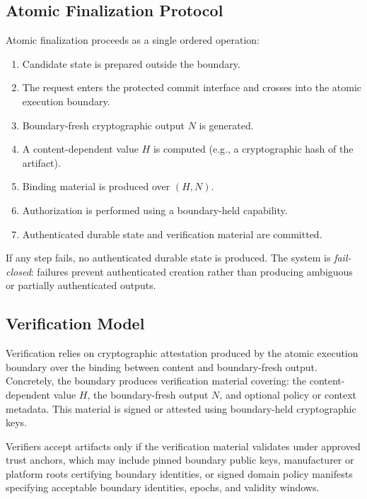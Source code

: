 \documentclass[11pt,letterpaper]{article}
\theoremstyle{occplain}
\theoremstyle{occremark}
\begin{document}
\subsection{Atomic Finalization Protocol}
\label{sec:finalization-protocol}

Atomic finalization proceeds as a single ordered operation:
\begin{enumerate}
  \item Candidate state is prepared outside the boundary.
  \item The request enters the protected commit interface and crosses into the atomic execution boundary.
  \item Boundary-fresh cryptographic output $N$ is generated.
  \item A content-dependent value $H$ is computed (e.g., a cryptographic hash of the artifact).
  \item Binding material is produced over $(H, N)$.
  \item Authorization is performed using a boundary-held capability.
  \item Authenticated durable state and verification material are committed.
\end{enumerate}

If any step fails, no authenticated durable state is produced. The system is \emph{fail-closed}: failures prevent authenticated creation rather than producing ambiguous or partially authenticated outputs.


\subsection{Verification Model}
\label{sec:verification-model}

Verification relies on cryptographic attestation produced by the atomic execution boundary over the binding between content and boundary-fresh output. Concretely, the boundary produces verification material covering: the content-dependent value $H$, the boundary-fresh output $N$, and optional policy or context metadata. This material is signed or attested using boundary-held cryptographic keys.

Verifiers accept artifacts only if the verification material validates under approved trust anchors, which may include pinned boundary public keys, manufacturer or platform roots certifying boundary identities, or signed domain policy manifests specifying acceptable boundary identities, epochs, and validity windows.
\end{document}
